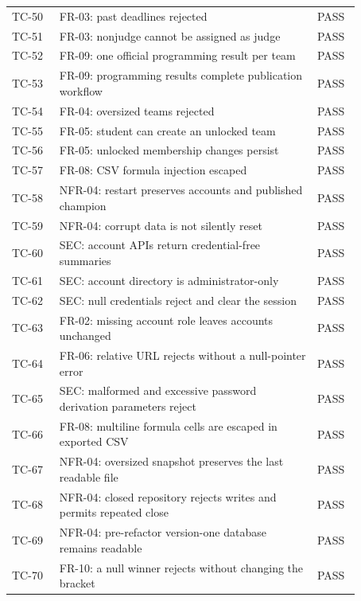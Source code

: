 \begin{longtable}{p{0.12\linewidth}p{0.65\linewidth}p{0.1\linewidth}}
TC-50 & FR-03: past deadlines rejected & PASS\\
TC-51 & FR-03: nonjudge cannot be assigned as judge & PASS\\
TC-52 & FR-09: one official programming result per team & PASS\\
TC-53 & FR-09: programming results complete publication workflow & PASS\\
TC-54 & FR-04: oversized teams rejected & PASS\\
TC-55 & FR-05: student can create an unlocked team & PASS\\
TC-56 & FR-05: unlocked membership changes persist & PASS\\
TC-57 & FR-08: CSV formula injection escaped & PASS\\
TC-58 & NFR-04: restart preserves accounts and published champion & PASS\\
TC-59 & NFR-04: corrupt data is not silently reset & PASS\\
TC-60 & SEC: account APIs return credential-free summaries & PASS\\
TC-61 & SEC: account directory is administrator-only & PASS\\
TC-62 & SEC: null credentials reject and clear the session & PASS\\
TC-63 & FR-02: missing account role leaves accounts unchanged & PASS\\
TC-64 & FR-06: relative URL rejects without a null-pointer error & PASS\\
TC-65 & SEC: malformed and excessive password derivation parameters reject & PASS\\
TC-66 & FR-08: multiline formula cells are escaped in exported CSV & PASS\\
TC-67 & NFR-04: oversized snapshot preserves the last readable file & PASS\\
TC-68 & NFR-04: closed repository rejects writes and permits repeated close & PASS\\
TC-69 & NFR-04: pre-refactor version-one database remains readable & PASS\\
TC-70 & FR-10: a null winner rejects without changing the bracket & PASS\\
\bottomrule\end{longtable}\normalsize
